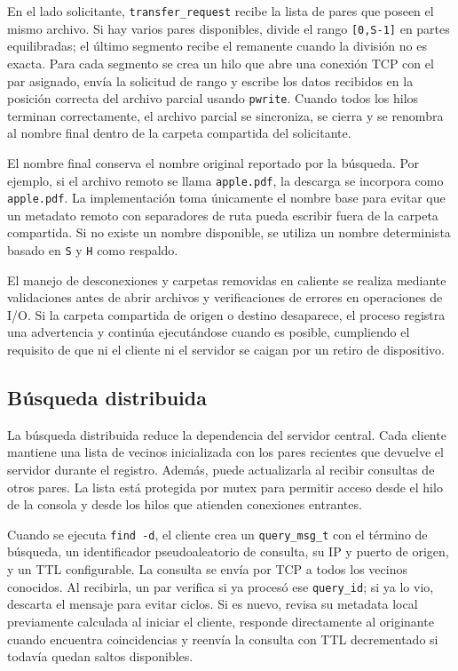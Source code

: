 \documentclass[12pt]{article}
\begin{document}
En el lado solicitante, \texttt{transfer\_request} recibe la lista de pares que
poseen el mismo archivo. Si hay varios pares disponibles, divide el rango
\texttt{[0,S-1]} en partes equilibradas; el último segmento recibe el remanente
cuando la división no es exacta. Para cada segmento se crea un hilo que abre una
conexión TCP con el par asignado, envía la solicitud de rango y escribe los
datos recibidos en la posición correcta del archivo parcial usando
\texttt{pwrite}. Cuando todos los hilos terminan correctamente, el archivo
parcial se sincroniza, se cierra y se renombra al nombre final dentro de la
carpeta compartida del solicitante.

El nombre final conserva el nombre original reportado por la búsqueda. Por
ejemplo, si el archivo remoto se llama \texttt{apple.pdf}, la descarga se
incorpora como \texttt{apple.pdf}. La implementación toma únicamente el nombre
base para evitar que un metadato remoto con separadores de ruta pueda escribir
fuera de la carpeta compartida. Si no existe un nombre disponible, se utiliza
un nombre determinista basado en \texttt{S} y \texttt{H} como respaldo.

El manejo de desconexiones y carpetas removidas en caliente se realiza mediante
validaciones antes de abrir archivos y verificaciones de errores en operaciones
de I/O. Si la carpeta compartida de origen o destino desaparece, el proceso
registra una advertencia y continúa ejecutándose cuando es posible, cumpliendo
el requisito de que ni el cliente ni el servidor se caigan por un retiro de
dispositivo.

\subsection{Búsqueda distribuida}

La búsqueda distribuida reduce la dependencia del servidor central. Cada
cliente mantiene una lista de vecinos inicializada con los pares recientes que
devuelve el servidor durante el registro. Además, puede actualizarla al recibir
consultas de otros pares. La lista está protegida por mutex para permitir acceso
desde el hilo de la consola y desde los hilos que atienden conexiones entrantes.

Cuando se ejecuta \verb|find -d|, el cliente crea un \texttt{query\_msg\_t}
con el término de búsqueda, un identificador pseudoaleatorio de consulta, su IP
y puerto de origen, y un TTL configurable. La consulta se envía por TCP a todos
los vecinos conocidos. Al recibirla, un par verifica si ya procesó ese
\texttt{query\_id}; si ya lo vio, descarta el mensaje para evitar ciclos. Si es
nuevo, revisa su metadata local previamente calculada al iniciar el cliente,
responde directamente al originante cuando encuentra coincidencias y reenvía la
consulta con TTL decrementado si todavía quedan saltos disponibles.
\end{document}
